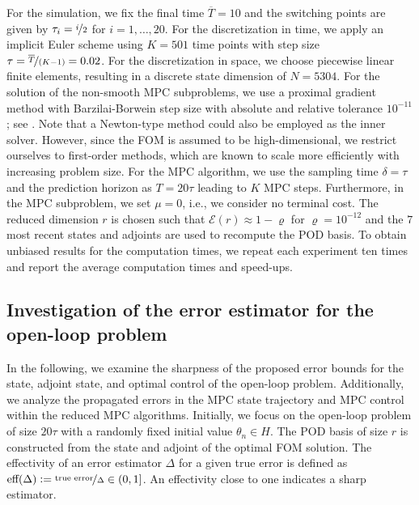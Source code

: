 \documentclass[reqno]{amsart}
\newcommand{\ReA}[1]{{\color{black}#1}}
\newcommand{\finalTime}{\overline{T}}
\newcommand{\stateDimRed}{r}
\newcommand{\calE}{\mathcal{E}}
\newcommand{\abbr}[1]{\textsf{#1}\xspace}
\newcommand{\FOM}{\abbr{FOM}}
\newcommand{\MPC}{\abbr{MPC}}
\newcommand{\POD}{\abbr{POD}} %
\begin{document}
%
For the simulation, we fix the final time $\finalTime = 10$ and the switching points are given by $\tau_i=\nicefrac{i}{2}$ for $i=1,\ldots,20$. For the discretization in time, we apply an implicit Euler scheme using $K= 501$ time points with step size $\tau = \nicefrac{\finalTime}{(K-1)}=0.02$. For the discretization in space, we choose piecewise linear finite elements, resulting in a discrete state dimension of $N=5304$. For the solution of the non-smooth \MPC subproblems, we use a proximal gradient method with Barzilai-Borwein step size with absolute and relative tolerance $10^{-11}$; see \cite{azmi2023nonmonotone}. \ReA{Note that a Newton-type method could also be employed as the inner solver. However, since the \FOM is assumed to be high-dimensional, we restrict ourselves to first-order methods, which are known to scale more efficiently with increasing problem size.} For the \MPC algorithm, we use the sampling time $\delta = \tau $ and the prediction horizon as $T= 20\tau$ leading to $K$ \MPC steps. Furthermore, in the \MPC subproblem, we set $\mu =0$, i.e., we consider no terminal cost. The reduced dimension $\stateDimRed$ is chosen such that $\calE(\stateDimRed)\approx 1-\varrho$ for $\varrho=10^{-12}$ and the $7$ most recent states and adjoints are used to recompute the \POD basis. \ReA{To obtain unbiased results for the computation times, we repeat each experiment ten times and report the average computation times and speed-ups.}
%
\subsection{Investigation of the error estimator for the open-loop problem}
\label{subsec:numerics:openloop}
%
In the following, we examine the sharpness of the proposed error bounds for the state, adjoint state, and optimal control of the open-loop problem. Additionally, we analyze the propagated errors in the \MPC state trajectory and \MPC control within the reduced \MPC algorithms. Initially, we focus on the open-loop problem of size $20\tau$ with a randomly fixed initial value $\theta_n \in H$. The \POD basis of size $\stateDimRed$ is constructed from the state and adjoint of the optimal \FOM solution. The effectivity of an error estimator $\Delta$ for a given true error is defined as $\text{eff}(\Delta) \vcentcolon= \nicefrac{\text{true error}}{\Delta} \in (0,1]$. An effectivity close to one indicates a sharp estimator.
\end{document}
